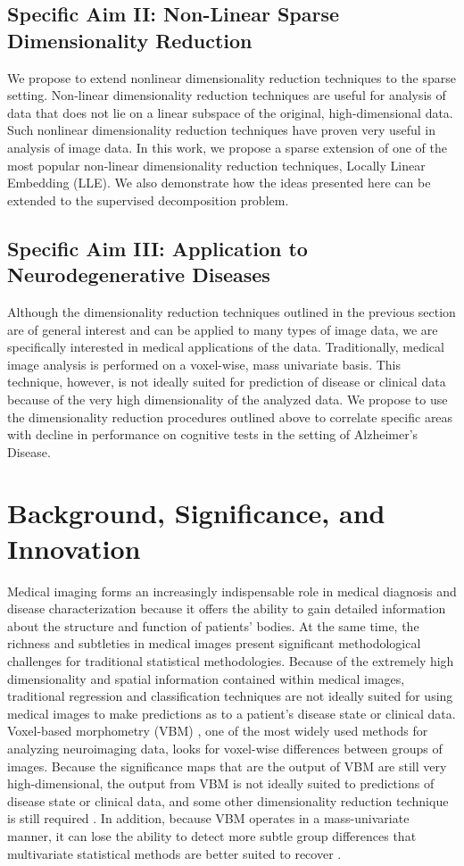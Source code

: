 \documentclass[11pt]{nih}
\begin{document}
\subsection*{Specific Aim II: Non-Linear Sparse Dimensionality Reduction}
We propose to extend nonlinear dimensionality reduction techniques to the sparse setting.  Non-linear dimensionality reduction techniques are useful for analysis of data that does not lie on a linear subspace of the original, high-dimensional data.  Such nonlinear dimensionality reduction techniques have proven very useful in analysis of image data. In this work, we propose a sparse extension of one of the most popular non-linear dimensionality reduction techniques, Locally Linear Embedding (LLE).  We also demonstrate how the ideas presented here can be extended to the supervised decomposition problem. 
\subsection*{Specific Aim III: Application to Neurodegenerative Diseases}
Although the dimensionality reduction techniques outlined in the previous section are of general interest and can be applied to many types of image data, we are specifically interested in medical applications of the data.  Traditionally, medical image analysis is performed on a voxel-wise, mass univariate basis.  This technique, however, is not ideally suited for prediction of disease or clinical data because of the very high dimensionality of the analyzed data.  We propose to use the dimensionality reduction procedures outlined above to correlate specific areas  with decline in performance on cognitive tests in the setting of  Alzheimer's Disease. 

\section*{Background, Significance, and Innovation}
Medical imaging forms an increasingly indispensable role in medical diagnosis and disease characterization because it offers the ability to gain detailed information about the structure and function of patients' bodies.  At the same time, the richness and subtleties in medical images present significant methodological challenges for traditional statistical methodologies.  Because of the extremely high dimensionality and spatial information contained within medical images, traditional regression and classification techniques are not ideally suited for using medical images to make predictions as to a patient's disease state or clinical data.  Voxel-based morphometry (VBM) \cite{ashburner_voxel-based_2000}, one of the most widely used methods for analyzing neuroimaging data, looks for voxel-wise differences between groups of images.  Because the significance maps that are the output of VBM are still very high-dimensional, the output from VBM is not ideally suited to predictions of disease state or clinical data, and some other dimensionality reduction technique is still required \cite{batmanghelich_general_2009}.  In addition, because VBM operates in a mass-univariate manner, it can lose the ability to detect more subtle group differences that multivariate statistical methods are better suited to recover \cite{davatzikos_why_2004}.
\end{document}
